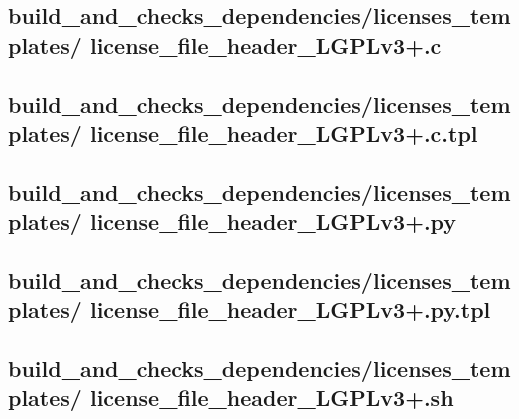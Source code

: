 \documentclass{article}
\begin{document}


\subsection{
  build\_and\_checks\_dependencies/licenses\_templates/%
license\_file\_header\_LGPLv3+.c
}
\label{
  build_and_checks_dependencies:licenses_templates:%
license_file_header_LGPLv3+c
}



\subsection{
  build\_and\_checks\_dependencies/licenses\_templates/%
license\_file\_header\_LGPLv3+.c.tpl
}
\label{
  build_and_checks_dependencies:licenses_templates:%
license_file_header_LGPLv3+ctpl
}



\subsection{
  build\_and\_checks\_dependencies/licenses\_templates/%
license\_file\_header\_LGPLv3+.py
}
\label{
  build_and_checks_dependencies:licenses_templates:%
license_file_header_LGPLv3+py
}



\subsection{
  build\_and\_checks\_dependencies/licenses\_templates/%
license\_file\_header\_LGPLv3+.py.tpl
}
\label{
  build_and_checks_dependencies:licenses_templates:%
license_file_header_LGPLv3+pytpl
}



\subsection{
  build\_and\_checks\_dependencies/licenses\_templates/%
license\_file\_header\_LGPLv3+.sh
}
\label{
  build_and_checks_dependencies:licenses_templates:%
license_file_header_LGPLv3+sh
}
\end{document}
